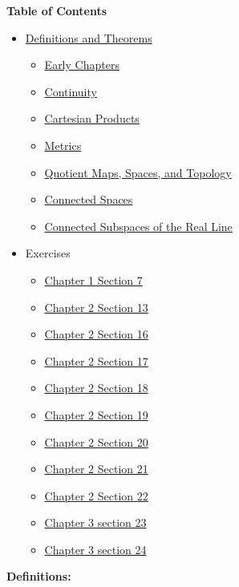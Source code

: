 \documentclass[12pt,letterpaper]{article}
\begin{document}
\RaggedRight
\textbf{Table of Contents}
\begin{itemize}
  \item[] \hyperref[sec:Definitions]{Definitions and Theorems}
  \begin{itemize}
    \item[] \hyperref[sec:EarlyChapters]{Early Chapters}
    \item[] \hyperref[sec:continuity]{Continuity}
    \item[] \hyperref[dfn:cartesianProducts]{Cartesian Products}
    \item[] \hyperref[dfn:metric]{Metrics}
    \item[] \hyperref[dfn:quotientMapTopology]{Quotient Maps, Spaces, and Topology}
    \item[] \hyperref[sec:connectedness]{Connected Spaces}
    \item[] \hyperref[sec:connectedRealLine]{Connected Subspaces of the Real Line}
  \end{itemize}
  \item[]  Exercises
  \begin{itemize}
    \item[] \hyperref[sec:chapter1.7]{Chapter 1 Section 7}
    \item[] \hyperref[sec:chapter2.13]{Chapter 2 Section 13}
    \item[] \hyperref[sec:chapter2.16]{Chapter 2 Section 16}
    \item[] \hyperref[sec:chapter2.17]{Chapter 2 Section 17}
    \item[] \hyperref[sec:chapter2.18]{Chapter 2 Section 18}
    \item[] \hyperref[sec:chapter2.19]{Chapter 2 Section 19}
    \item[] \hyperref[sec:chapter2.20]{Chapter 2 Section 20}
    \item[] \hyperref[sec:chapter2.21]{Chapter 2 Section 21}
    \item[] \hyperref[sec:chapter2.22]{Chapter 2 Section 22}
    \item[] \hyperref[sec:chapter3.23]{Chapter 3 section 23}
    \item[] \hyperref[sec:chapter3.24]{Chapter 3 section 24}
  \end{itemize}
\end{itemize}
\noindent \textbf{Definitions:} \label{sec:Definitions}
\end{document}
